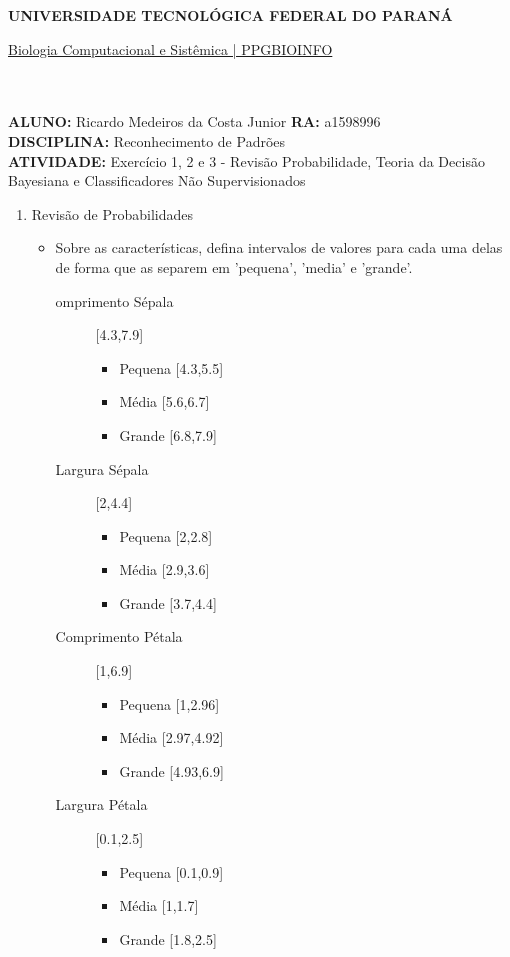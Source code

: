 \documentclass[a4paper, 12pt]{article}
\begin{document}
\textbf{UNIVERSIDADE TECNOLÓGICA FEDERAL DO PARANÁ}\\
\centerline{\underline{Biologia Computacional e Sistêmica | PPGBIOINFO}}\\\\
\textbf{ALUNO:} Ricardo Medeiros da Costa Junior   \textbf{RA:} a1598996 \\
\textbf{DISCIPLINA:} Reconhecimento de Padrões\\
\textbf{ATIVIDADE:} Exercício 1, 2 e 3 - Revisão Probabilidade, Teoria da Decisão Bayesiana e Classificadores Não Supervisionados \\
\begin{enumerate}
  \item Revisão de Probabilidades
\begin{itemize} 
\item Sobre as características, defina intervalos de valores para cada uma delas de forma que as separem em 'pequena', 'media' e 'grande'.
  \begin{description}
  \item[omprimento Sépala ] [4.3,7.9]
    \begin{itemize}
    \item Pequena {[}4.3,5.5{]}
    \item Média {[}5.6,6.7{]}
    \item Grande {[}6.8,7.9{]}      
    \end{itemize}
  \end{description}
  \begin{description}
  \item[Largura Sépala ] [2,4.4]
    \begin{itemize}
    \item Pequena {[}2,2.8{]}
    \item Média {[}2.9,3.6{]}
    \item Grande {[}3.7,4.4{]}      
    \end{itemize}
  \end{description}
  \begin{description}
  \item[Comprimento Pétala ] [1,6.9]
    \begin{itemize}
    \item Pequena {[}1,2.96{]}
    \item Média {[}2.97,4.92{]}
    \item Grande {[}4.93,6.9{]}      
    \end{itemize}
  \end{description}
  \begin{description}
  \item[Largura Pétala ] [0.1,2.5]
    \begin{itemize}
    \item Pequena {[}0.1,0.9{]}
    \item Média {[}1,1.7{]}
    \item Grande {[}1.8,2.5{]}      
    \end{itemize}
  \end{description}


\end{itemize}
\end{enumerate}
\end{document}

